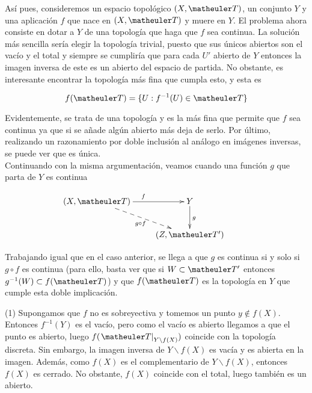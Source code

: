 Así pues, consideremos un espacio topológico $(X,\T)$, un conjunto $Y$ y una aplicación $f$ que nace en $(X,\T)$ y muere en $Y$. El problema ahora consiste en dotar a $Y$ de una topología que haga que $f$ sea continua. La solución más sencilla sería elegir la topología trivial, puesto que sus únicos abiertos son el vacío y el total y siempre se cumpliría que para cada $U'$ abierto de $Y$ entonces la imagen inversa de este es un abierto del espacio de partida. No obstante, es interesante encontrar la topología más fina que cumpla esto, y esta es 

\[f(\T)=\{U: f^{-1}(U)\in \T\}\]

Evidentemente, se trata de una topología y es la más fina que permite que $f$ sea continua ya que si se añade algún abierto más deja de serlo. Por último, realizando un razonamiento por doble inclusión al análogo en imágenes inversas, se puede ver que es única. \\

Continuando con la misma argumentación, veamos cuando una función $g$ que parta de $Y$ es continua

\begin{equation}
\label{cont_propiedad_universal_top_imagen}
\xymatrix{
(X,\T) \ar[r]^f \ar@{-->}[rd]_{g\circ f} &
Y \ar[d]^g & \\
&(Z,\T')}
\end{equation}

Trabajando igual que en el caso anterior, se llega a que $g$ es continua si y solo si $g\circ f$ es continua (para ello, basta ver que si $W\subset \T'$ entonces $g^{-1}(W)\subset f(\T)$) y que $f(\T)$ es la topología en $Y$ que cumple esta doble implicación. \\

\begin{obs}[Sobreyectividad]

(1) Supongamos que $f$ no es sobreyectiva y tomemos un punto $y\notin f(X)$. Entonces $f^{-1}(Y)$ es el vacío, pero como el vacío es abierto llegamos a que el punto es abierto, luego $f(\left.\T\right|_{Y\backslash f(X)})$ coincide con la topología discreta. Sin embargo, la imagen inversa de $Y\backslash f(X)$ es vacía y es abierta en la imagen. Además, como $f(X)$ es el complementario de $Y\backslash f(X)$, entonces $f(X)$ es cerrado. No obstante, $f(X)$ coincide con el total, luego también es un abierto. 

\end{obs}